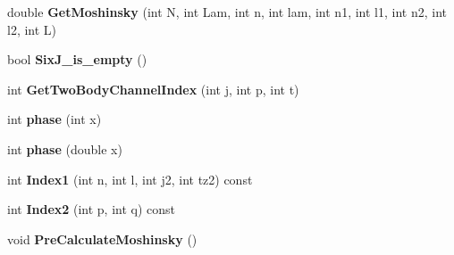 \begin{DoxyCompactItemize}
\item 
\hypertarget{classModelSpace_a85f0b95b2cd46504702ea80489455beb}{double {\bfseries Get\-Moshinsky} (int N, int Lam, int n, int lam, int n1, int l1, int n2, int l2, int L)}\label{classModelSpace_a85f0b95b2cd46504702ea80489455beb}

\item 
\hypertarget{classModelSpace_aae435e6ade2addd7787e7948a3ae542c}{bool {\bfseries Six\-J\-\_\-is\-\_\-empty} ()}\label{classModelSpace_aae435e6ade2addd7787e7948a3ae542c}

\item 
\hypertarget{classModelSpace_ae73e211248e6f2bd4cc1bb0f030144ce}{int {\bfseries Get\-Two\-Body\-Channel\-Index} (int j, int p, int t)}\label{classModelSpace_ae73e211248e6f2bd4cc1bb0f030144ce}

\item 
\hypertarget{classModelSpace_a6b4d1686088e3fef492df10bbd806fe2}{int {\bfseries phase} (int x)}\label{classModelSpace_a6b4d1686088e3fef492df10bbd806fe2}

\item 
\hypertarget{classModelSpace_a07d1c8f00131cc6c192d440e6be329f3}{int {\bfseries phase} (double x)}\label{classModelSpace_a07d1c8f00131cc6c192d440e6be329f3}

\item 
\hypertarget{classModelSpace_ab9e4a36b032abc3fcd81da8b2a8707d2}{int {\bfseries Index1} (int n, int l, int j2, int tz2) const }\label{classModelSpace_ab9e4a36b032abc3fcd81da8b2a8707d2}

\item 
\hypertarget{classModelSpace_acb31fdcb54a8fe3168378969176f0157}{int {\bfseries Index2} (int p, int q) const }\label{classModelSpace_acb31fdcb54a8fe3168378969176f0157}

\item 
\hypertarget{classModelSpace_abc436144ee034558058227cac872ecb9}{void {\bfseries Pre\-Calculate\-Moshinsky} ()}\label{classModelSpace_abc436144ee034558058227cac872ecb9}

\end{DoxyCompactItemize}
